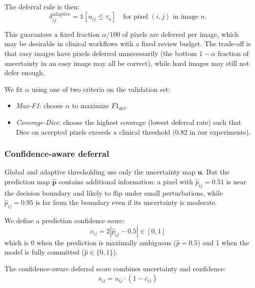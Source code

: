 The deferral rule is then:
\begin{equation}
  \delta_{ij}^{\text{adaptive}} = \mathbb{1}[u_{ij} \leq \tau_n]
  \quad \text{for pixel } (i,j) \text{ in image } n.
  \label{eq:adaptive}
\end{equation}

This guarantees a fixed fraction $\alpha / 100$ of pixels are deferred
per image, which may be desirable in clinical workflows with a fixed
review budget. The trade-off is that easy images have pixels deferred
unnecessarily (the bottom $1-\alpha$ fraction of uncertainty in an
easy image may all be correct), while hard images may still not defer
enough.

We fit $\alpha$ using one of two criteria on the validation set:
\begin{itemize}[leftmargin=*]
  \item \emph{Max-F1}: choose $\alpha$ to maximize $F1_{\text{def}}$.
  \item \emph{Coverage-Dice}: choose the highest coverage (lowest deferral
  rate) such that Dice on accepted pixels exceeds a clinical threshold
  (0.82 in our experiments).
\end{itemize}

\subsubsection{Confidence-aware deferral}

Global and adaptive thresholding use only the uncertainty map $\mathbf{u}$.
But the prediction map $\hat{\mathbf{p}}$ contains additional information:
a pixel with $\hat{p}_{ij} = 0.51$ is near the decision boundary and likely
to flip under small perturbations, while $\hat{p}_{ij} = 0.95$ is far from
the boundary even if its uncertainty is moderate.

We define a prediction confidence score:
\begin{equation}
  c_{ij} = 2 \left| \hat{p}_{ij} - 0.5 \right| \in [0, 1]
  \label{eq:confidence}
\end{equation}
which is 0 when the prediction is maximally ambiguous ($\hat{p} = 0.5$) and
1 when the model is fully committed ($\hat{p} \in \{0, 1\}$).

The confidence-aware deferral score combines uncertainty and confidence:
\begin{equation}
  s_{ij} = u_{ij} \cdot (1 - c_{ij})
  \label{eq:conf_score}
\end{equation}

